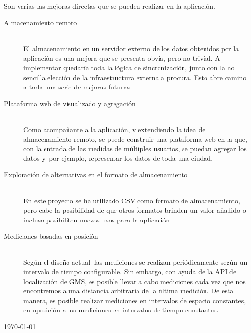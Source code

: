 
	Son varias las mejoras directas que se pueden realizar en la aplicación.
\begin{description}
	\item[Almacenamiento remoto] \hfill \\	
	El almacenamiento en un servidor externo de los datos obtenidos por la aplicación es una mejora que se presenta obvia, pero no trivial. A implementar quedaría toda la lógica de sincronización, junto con la no sencilla elección de la infraestructura externa a procura. Esto abre camino a toda una serie de mejoras futuras.	
	
	\item[Plataforma web de visualizado y agregación]\hfill \\	
	Como acompañante a la aplicación, y extendiendo la idea de almacenamiento remoto, se puede construir una plataforma web en la que, con la entrada de las medidas de múltiples usuarios, se puedan agregar los datos y, por ejemplo, representar los datos de toda una ciudad.
	
    \item[Exploración de alternativas en el formato de almacenamiento]\hfill \\	
    En este proyecto se ha utilizado \ac{CSV} como formato de almacenamiento, pero cabe la posibilidad de que otros formatos brinden un valor añadido o incluso posibiliten nuevos usos para la aplicación.
    
    \item[Mediciones basadas en posición]\hfill \\	
    Según el diseño actual, las mediciones se realizan periódicamente según un intervalo de tiempo configurable. Sin embargo, con ayuda de la \ac{API} de localización de \ac{GMS}, es posible llevar a cabo mediciones cada vez que nos encontremos a una distancia arbitraria de la última medición. De esta manera, es posible realizar mediciones en intervalos de espacio constantes, en oposición a las mediciones en intervalos de tiempo constantes.
	
\end{description}

\begin{flushright}
{\large \pfcauthorname}\nli
\today
\end{flushright}
	
\chapterend{}